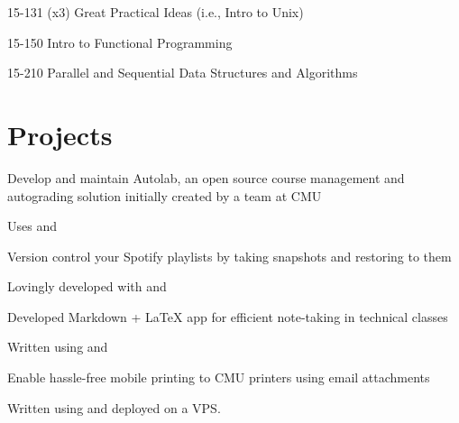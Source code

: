 \documentclass[]{deedy-resume-openfont}
\begin{document}
\begin{minipage}[t]{0.66\textwidth}
\begin{tightemize}
\item 15-131 (x3) Great Practical Ideas (i.e., Intro to Unix)
\item 15-150 Intro to Functional Programming
\item 15-210 Parallel and Sequential Data Structures and Algorithms
\end{tightemize}
\sectionsep


\section{Projects}
\descript{}
\begin{tightemize}
\item Develop and maintain Autolab, an open source course management and
  autograding solution initially created by a team at CMU
\item Uses  and 
\end{tightemize}
\sectionsep

\descript{}
\begin{tightemize}
\item Version control your Spotify playlists by taking snapshots and restoring
  to them
\item Lovingly developed with  and 
\end{tightemize}
\sectionsep

\descript{}
\begin{tightemize}
\item Developed Markdown + \LaTeX{} app for efficient note-taking in technical
  classes
\item Written using  and 
\end{tightemize}
\sectionsep

\descript{}
\begin{tightemize}
\item Enable hassle-free mobile printing to CMU printers using email attachments
\item Written using  and  deployed on a
   VPS.
\end{tightemize}
\sectionsep



\end{minipage}
\end{document}
